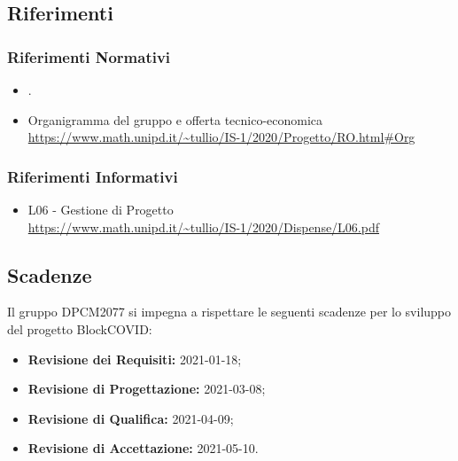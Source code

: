 \subsection{Riferimenti}
\subsubsection{Riferimenti Normativi}
\begin{itemize}
	\item {}.
    \item{Organigramma del gruppo e offerta tecnico-economica} \\
 \url{https://www.math.unipd.it/~tullio/IS-1/2020/Progetto/RO.html#Org}
\end{itemize}
\subsubsection{Riferimenti Informativi}
\begin{itemize}
	\item {L06 - Gestione di Progetto} \\
 \url{https://www.math.unipd.it/~tullio/IS-1/2020/Dispense/L06.pdf}
\end{itemize}

\subsection{Scadenze}
Il gruppo DPCM2077 si impegna a rispettare le seguenti scadenze per lo sviluppo del progetto BlockCOVID:
\begin{itemize}
	\item \textbf{Revisione dei Requisiti:} 2021-01-18; \\
	\item \textbf{Revisione di Progettazione:} 2021-03-08; \\
	\item \textbf{Revisione di Qualifica:} 2021-04-09; \\
	\item \textbf{Revisione di Accettazione:} 2021-05-10. \\
\end{itemize}





